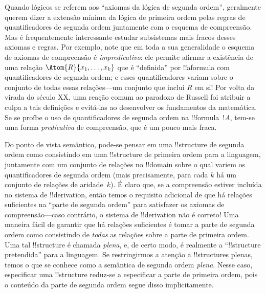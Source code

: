 \documentclass[../../../include/open-logic-section]{subfiles}
\begin{document}
Quando lógicos se referem aos ``axiomas da lógica de segunda ordem'', geralmente
querem dizer a extensão mínima da lógica de primeira ordem pelas
regras de quantificadores de segunda ordem juntamente com o esquema de
compreensão. Mas é frequentemente interessante estudar subsistemas mais fracos desses
axiomas e regras. Por exemplo, note que em toda a sua generalidade
o esquema de axiomas de compreensão é \emph{impredicativo}: ele permite
afirmar a existência de uma relação $\Atom{R}{x_1, \dots, x_k}$
que é ``definida'' por !!a{formula} com quantificadores de segunda ordem; e
esses quantificadores variam sobre o conjunto de todas essas relações---um conjunto
que inclui $R$ em si!{} Por volta da virada do século XX, uma
reação comum ao paradoxo de Russell foi atribuir a culpa a tais
definições e evitá-las ao desenvolver os fundamentos da
matemática. Se se proíbe o uso de quantificadores de segunda ordem na
!!{formula}~$!A$, tem-se uma forma {\em predicativa} de
compreensão, que é um pouco mais fraca.

Do ponto de vista semântico, pode-se pensar em uma !!{structure} de segunda ordem
como consistindo em uma !!{structure} de primeira ordem para a
linguagem, juntamente com um conjunto de relações no !!{domain} sobre o qual
variem os quantificadores de segunda ordem (mais precisamente, para cada $k$ há
um conjunto de relações de aridade~$k$). É claro que, se a compreensão estiver
incluída no sistema de !!{derivation}, então temos o requisito adicional de que
há relações suficientes na ``parte de segunda ordem'' para satisfazer os
axiomas de compreensão---caso contrário, o sistema de !!{derivation} não é correto!{} Uma
maneira fácil de garantir que há relações suficientes é tomar
a parte de segunda ordem como consistindo de \emph{todas} as relações sobre a
parte de primeira ordem. Uma tal !!{structure} é chamada \emph{plena}, e, de certo
modo, é realmente a ``!!{structure} pretendida'' para a linguagem. Se
restringirmos a atenção a !!{structure}s plenas, temos o que se conhece
como a semântica de segunda ordem \emph{plena}. Nesse caso, especificar uma
!!{structure} reduz-se a especificar a parte de primeira ordem, pois o
conteúdo da parte de segunda ordem segue disso implicitamente.
\end{document}
